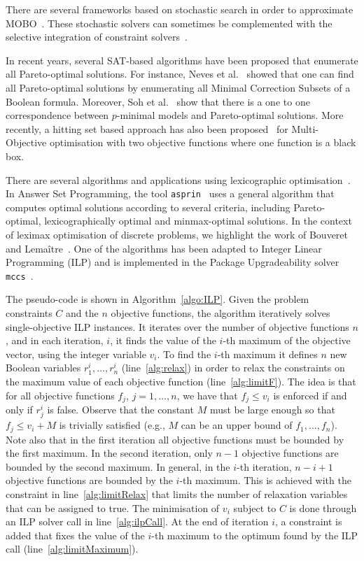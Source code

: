 \documentclass[a4paper,UKenglish,cleveref, autoref, thm-restate]{lipics-v2021}
\begin{document}
There are several frameworks based on stochastic search in order to 
approximate MOBO~\cite{DBLP:conf/ppsn/DebAPM00,DBLP:journals/tec/ZhangL07}.
These stochastic solvers can sometimes be complemented with the
selective integration of constraint 
solvers~\cite{DBLP:conf/icse/HenardPHT15,DBLP:journals/tosem/XiangZZL18}.

In recent years, several SAT-based algorithms have been proposed that 
enumerate all Pareto-optimal solutions.
For instance, Neves et al.~\cite{neves-intro} showed that one can find all
Pareto-optimal solutions by enumerating all Minimal Correction Subsets of
a Boolean formula. Moreover, Soh et al.~\cite{DBLP:conf/cp/SohBTB17} show 
that there is a one to one correspondence between
$p$-minimal models and Pareto-optimal solutions. More recently, a hitting
set based approach has also been proposed~\cite{DBLP:conf/cp/JanotaMSM21}
for Multi-Objective optimisation with two objective functions where one
function is a black box.

There are several algorithms and applications using lexicographic
optimisation~\cite{BolLexiMarques-Silva2011}.
In Answer Set Programming, the tool \texttt{asprin}~\cite{asprin,asprin-webpage} uses a general algorithm that computes optimal solutions according to several criteria, including Pareto-optimal, lexicographically optimal and minmax-optimal solutions.
In the context of leximax optimisation of discrete problems, we highlight the work of Bouveret and Lemaître~\cite{bouveret2009computing}. 
One of the algorithms has been adapted to Integer Linear Programming (ILP) and is implemented in the Package Upgradeability solver \texttt{mccs}~\cite{mccs-webpage,mancoosi-del-4.3,milp2010}.

The pseudo-code is shown in Algorithm~\ref{algo:ILP}.
Given the problem constraints $C$ and the $n$ objective functions, the algorithm iteratively solves single-objective ILP instances.
It iterates over the number of objective functions $n$, and in each iteration, $i$, it finds the value of the $i$-th maximum of the objective vector, using the integer variable $v_i$.
To find the $i$-th maximum it defines $n$ new Boolean variables $r^i_1,\dots,r^i_n$ (line~\ref{alg:relax}) in order to relax the constraints on the maximum value of each objective function (line~\ref{alg:limitF}).
The idea is that for all objective functions $f_j$, $j=1,\dots,n$, we have that
$f_j \leq v_i$ is enforced if and only if $r^i_j$ is false.
Observe that the constant $M$ must be large enough so that $f_j \leq v_i + M$ is trivially satisfied (e.g., $M$ can be an upper bound of $f_1,\dots,f_n$).
Note also that in the first iteration all objective functions must be bounded
by the first maximum. In the second iteration, only $n-1$ objective functions
are bounded by the second maximum. In general, in the $i$-th iteration,
$n-i+1$ objective functions are bounded by the $i$-th maximum.
This is achieved with the constraint in line~\ref{alg:limitRelax} that limits
the number of relaxation variables that can be assigned to true.
The minimisation of $v_i$ subject to $C$ is done through an ILP solver call in line~\ref{alg:ilpCall}.
At the end of iteration $i$, a constraint is added that fixes the value of the $i$-th maximum to the optimum found by the ILP call (line~\ref{alg:limitMaximum}).
\end{document}
